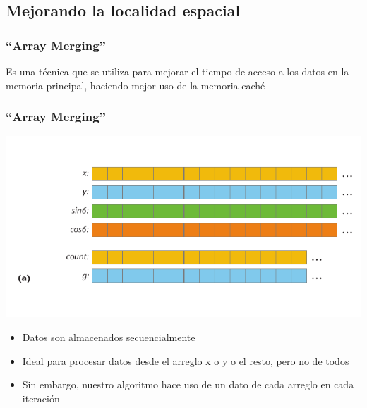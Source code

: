 \documentclass{beamer}
\begin{document}
\subsection{Mejorando la localidad espacial}
\frame
{
\frametitle{``Array Merging''}
	Es una técnica que se utiliza para mejorar el tiempo de acceso a los datos en la
	memoria principal, haciendo mejor uso de la memoria caché
}

\frame
{
\frametitle{``Array Merging''}
	\begin{center}
		\includegraphics[scale=0.4]{../informe/images/array-1.png}
	\end{center}
	\begin{itemize}
		\item Datos son almacenados secuencialmente
		\item Ideal para procesar datos desde el arreglo x o y o el resto, pero no de todos
		\item Sin embargo, nuestro algoritmo hace uso de un dato de cada arreglo en cada iteración
	\end{itemize}		
}
\end{document}
